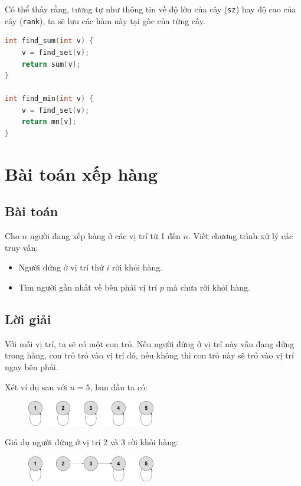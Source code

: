 Có thể thấy rằng, tương tự như thông tin về độ lớn của cây (\texttt{sz}) hay độ cao của cây (\texttt{rank}), ta sẽ lưu các hàm này tại gốc của từng cây.

\begin{lstlisting}[language=C++]
int find_sum(int v) {
    v = find_set(v);
    return sum[v];
}

int find_min(int v) { 
    v = find_set(v);
    return mn[v];
}
\end{lstlisting}

\section{Bài toán xếp hàng}

\subsection*{Bài toán}

Cho \( n \) người đang xếp hàng ở các vị trí từ 1 đến \( n \). Viết chương trình xử lý các truy vấn:

\begin{itemize}
    \item Người đứng ở vị trí thứ \( i \) rời khỏi hàng.
    \item Tìm người gần nhất về bên phải vị trí \( p \) mà chưa rời khỏi hàng.
\end{itemize}

\subsection*{Lời giải}

Với mỗi vị trí, ta sẽ có một con trỏ. Nếu người đứng ở vị trí này vẫn đang đứng trong hàng, con trỏ trỏ vào vị trí đó, nếu không thì con trỏ này sẽ trỏ vào vị trí ngay bên phải.

Xét ví dụ sau với \( n = 5 \), ban đầu ta có:

\begin{figure}[h]
    \centering
    \includegraphics[width=0.5\textwidth]{resource/img/b8/disjoint-set-union_img3.png}
\end{figure}

Giả dụ người đứng ở vị trí 2 và 3 rời khỏi hàng:

\begin{figure}[h]
    \centering
    \includegraphics[width=0.5\textwidth]{resource/img/b8/disjoint-set-union_img4.png}
\end{figure}

